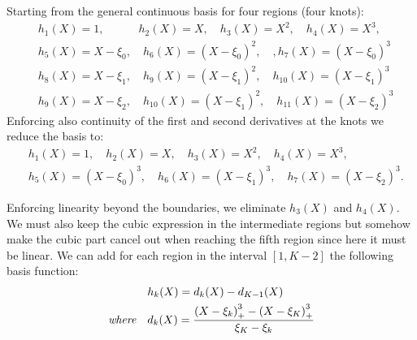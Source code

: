 \documentclass[12pt, letterpaper]{article}
\theoremstyle{definition}
\DeclarePairedDelimiter\autobracket{(}{)}
\newcommand{\br}[1]{\autobracket*{#1}}
\begin{document}
Starting from the general continuous basis for four regions (four knots):
\begin{equation}
\begin{aligned}
&h_1(X) =1, \quad\quad\quad h_2(X) =X,\quad h_3(X) =X^2,\quad  h_4(X) = X^3,\\
&h_5(X) = X-\xi_0,\quad h_6(X) = (X-\xi_0)^2,\quad, h_7(X) = (X-\xi_0)^3\\
&h_8(X) = X-\xi_1,\quad h_9(X) = (X-\xi_1)^2,\quad h_{10}(X) = (X-\xi_1)^3\\
&h_9(X) = X-\xi_2,\quad h_10(X) = (X-\xi_1)^2,\quad h_{11}(X) = (X-\xi_2)^3
\end{aligned}
\end{equation}
Enforcing also continuity of the first and second derivatives at the knots we reduce the basis to:
\begin{equation}
\begin{aligned}
&h_1(X) = 1, \quad h_2(X) =X,\quad h_3(X) =X^2,\quad  h_4(X) = X^3,\\
&h_5(X) = (X-\xi_0)^3, \quad h_6(X) = (X-\xi_1)^3, \quad h_7(X) = (X-\xi_2)^3.
\end{aligned}
\end{equation}

Enforcing linearity beyond the boundaries, we eliminate $ h_3(X)$ and $ h_4(X)$. We must also keep the cubic expression in the intermediate regions but somehow make the cubic part cancel out when reaching the fifth region since here it must be linear. We can add for each region in the interval $[1, K-2]$ the following basis function:
\begin{equation}
\begin{aligned}
&h_k(X) = d_k(X) - d_{K-1}(X)\\
\textit{where} \quad &d_k(X) = \frac{\br{X-\xi_k}_+^3 - \br{X-\xi_K}_+^3 }{\xi_K - \xi_k}
\end{aligned}
\end{equation}
\end{document}
